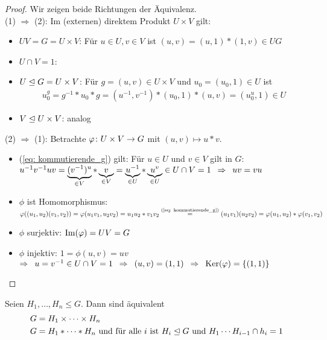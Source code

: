 \begin{proof} Wir zeigen beide Richtungen der Äquivalenz. \\
	(1) $\Rightarrow$ (2): Im (externen) direktem Produkt $U \times V$ gilt:
		\begin{itemize}
			\item $UV = G = U \times V$: Für $u \in U, v \in V$ ist $(u,v) = (u,1) * (1,v) \in UG$
			\item $U \cap V = 1$: \checkmark
			\item $U \normalteiler G = U \times V$: Für $g=(u,v) \in U \times V$ und $u_0 = (u_0,1) \in U$ ist
			\begin{align*}
				u_0^g=g^{-1}*u_0*g = (u^{-1},v^{-1}) * (u_0,1) * (u,v) = (u_0^u, 1) \in U
			\end{align*}
			\item $V \normalteiler U \times V$: analog
		\end{itemize}
	(2) $\Rightarrow$ (1): Betrachte $\abb{\phi}{U \times V}{G}$ mit $(u,v) \mapsto u*v$.
		\begin{itemize}
			\item (\ref{eq: kommutierende_g}) gilt: Für $u \in U$ und $v \in V$ gilt in $G$: \\
			$u^{-1} v^{-1} u v = \underbrace{(v^{-1})^u}_{\in V} * \underbrace{v}_{\in V} = \underbrace{u^{-1}}_{\in U} * \underbrace{u^v}_{\in U} \in U \cap V = 1 \follows uv = vu$
			\item $\phi$ ist Homomorphismus: \\
			$\phi((u_1,u_2) (v_1,v_2)) = \phi(u_1 v_1, u_2 v_2) = u_1 u_2 * v_1 v_2 \overset{\text{(\ref{eq: kommutierende_g})}}{=} (u_1 v_1)(u_2 v_2) = \phi(u_1 , u_2) * \phi(v_1 , v_2)$
			\item $\phi$ surjektiv: $\bild(\phi) = UV = G$
			\item $\phi$ injektiv: $1 = \phi(u,v) = uv$ \\
			$\Rightarrow \enspace u =  v^{-1} \in U \cap V = 1 \enspace \Rightarrow \enspace (u,v) = (1,1) \enspace \Rightarrow \enspace \Ker(\phi) = \menge{(1,1)}$
		\end{itemize}
\end{proof}
%
\begin{kor}
	Seien $H_1 , \dots , H_n \leq G$. Dann sind äquivalent
	\begin{align}
		G &= H_1 \times \cdots \times H_n \label{eq: kor_5.5-1} \\
		G &= H_1 * \cdots * H_n \text{ und für alle } i \text{ ist } H_i \normalteiler G \text{ und } H_1 \cdots H_{i-1} \cap h_i = 1 \label{eq: kor_5.5-2}
	\end{align}
\end{kor}
